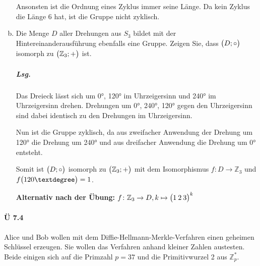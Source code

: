 \documentclass{scrreprt}
\begin{document}
\begin{enumerate}[(a)]
  Ansonsten ist die Ordnung eines Zyklus immer seine Länge.
  Da kein Zyklus die Länge 6 hat, ist die Gruppe nicht zyklisch.

\item Die Menge $D$ aller Drehungen aus $S_3$ bildet mit der
  Hintereinanderausführung ebenfalls eine Gruppe.
  Zeigen Sie, dass $\qty\big(D; \circ)$ isomorph zu
  $\qty\big(\mathbb{Z}_3; +)$ ist.

  \subparagraph{Lsg.} Das Dreieck lässt sich um 0°, 120° im Uhrzeigersinn
  und 240° im Uhrzeigersinn drehen.
  Drehungen um 0°, 240°, 120° gegen den Uhrzeigersinn sind dabei identisch
  zu den Drehungen im Uhrzeigersinn.

  Nun ist die Gruppe zyklisch, da aus zweifacher Anwendung der Drehung um 120°
  die Drehung um 240° und aus dreifacher Anwendung die Drehung um 0° entsteht.

  Somit ist $\qty\big(D; \circ)$ isomorph zu $\qty\big(\mathbb{Z}_3; +)$ mit dem
  Isomorphismus $f \colon D \to \mathbb{Z}_3$ und $f\qty\big(120°) = 1$.

  \textbf{Alternativ nach der Übung:}
  $f \colon \mathbb{Z}_3 \to D, k \mapsto \qty\big(1\:2\:3)^k$
\end{enumerate}

\newpage
\paragraph{Ü 7.4} Alice und Bob wollen mit dem Diffie-Hellmann-Merkle-Verfahren
einen geheimen Schlüssel erzeugen.
Sie wollen das Verfahren anhand kleiner Zahlen austesten.
Beide einigen sich auf die Primzahl $p = 37$ und die Primitivwurzel 2 aus
$\mathbb{Z}_p^*$.
\end{document}
